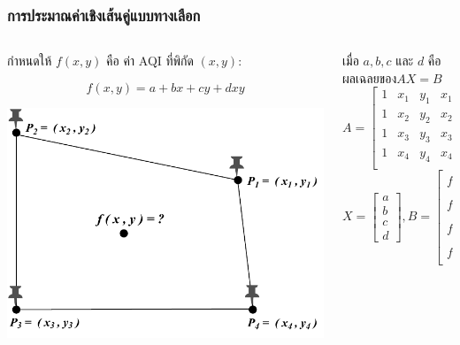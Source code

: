 \documentclass[12pt,aspectratio=169]{beamer}
\begin{document}
    \begin{frame}
        \frametitle{การประมาณค่าเชิงเส้นคู่แบบทางเลือก}
        \begin{columns}
            \begin{column}{0.5\textwidth}
            กำหนดให้ $f(x,y)$ คือ ค่า AQI ที่พิกัด $(x,y)$:
            \begin{block}{}
              \[
                    f(x,y)=a+bx+cy+dxy
               \]   
            \end{block}

               \begin{center}
                   \includegraphics[width=\textwidth]{img/region-selection-one-point.pdf}
               \end{center}
            \end{column}
            \begin{column}{0.4\textwidth}  
            เมื่อ $a,b,c$ และ $d$ คือผลเฉลยของ$AX = B$                
            \[
               A
               =\begin{bmatrix}
               1 & x_1 & y_1 & x_1y_1\\
               1 & x_2 & y_2 & x_2y_2\\
               1 & x_3 & y_3 & x_3y_3\\
               1 & x_4 & y_4 & x_4y_4\\
               \end{bmatrix},
        \]
        \[
               X = \begin{bmatrix}
                  a \\ b \\ c \\ d
               \end{bmatrix}
               ,
               B
               =\begin{bmatrix}
                  f(x_1,y_1) \\
                  f(x_2,y_2) \\
                  f(x_3,y_3) \\
                  f(x_4,y_4)
               \end{bmatrix}
        \]
            \end{column}
            \end{columns}
\end{frame}
    
\end{document}
